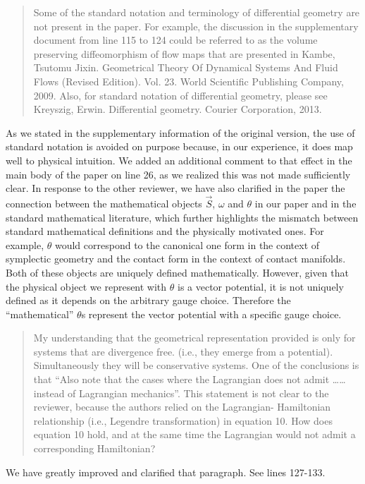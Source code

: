 \documentclass[11pt, executivepaper]{article}
\begin{document}
\begin{quote}
 Some of the standard notation and terminology of differential geometry are not present in the paper. For example, the discussion in the supplementary document from line 115 to 124 could be referred to as the volume preserving diffeomorphism of flow maps that are presented in Kambe, Tsutomu Jixin. Geometrical Theory Of Dynamical Systems And Fluid Flows (Revised Edition). Vol. 23. World Scientific Publishing Company, 2009. Also, for standard notation of differential geometry, please see Kreyszig, Erwin. Differential geometry. Courier Corporation, 2013. 
\end{quote}
As we stated in the supplementary information of the original version, the use of standard notation is avoided on purpose because, in our experience, it does map well to physical intuition. We added an additional comment to that effect in the main body of the paper on line 26, as we realized this was not made sufficiently clear. In response to the other reviewer, we have also clarified in the paper the connection between the mathematical objects $\vec{S}$, $\omega$ and $\theta$ in our paper and in the standard mathematical literature, which further highlights the mismatch between standard mathematical definitions and the physically motivated ones. For example, $\theta$ would correspond to the canonical one form in the context of symplectic geometry and the contact form in the context of contact manifolds. Both of these objects are uniquely defined mathematically. However, given that the physical object we represent with $\theta$ is a vector potential, it is not uniquely defined as it depends on the arbitrary gauge choice. Therefore the ``mathematical'' $\theta$s represent the vector potential with a specific gauge choice.

 
\begin{quote}
 My understanding that the geometrical representation provided is only for systems that are divergence free. (i.e., they emerge from a potential). Simultaneously they will be conservative systems.  One of the conclusions is that “Also note that the cases where the Lagrangian does not admit ……instead of Lagrangian mechanics”. This statement is not clear to the reviewer, because the authors relied on the Lagrangian- Hamiltonian relationship (i.e., Legendre transformation) in equation 10. How does equation 10 hold, and at the same time the Lagrangian would not admit a corresponding Hamiltonian? 
\end{quote}
We have greatly improved and clarified that paragraph. See lines 127-133.
\end{document}
